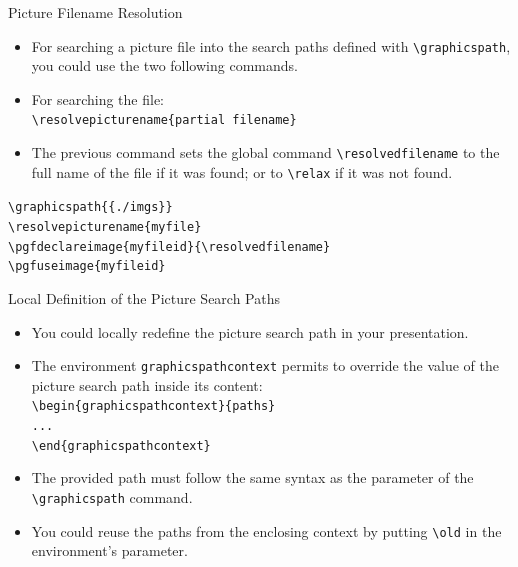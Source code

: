 \documentclass[english,sectioncirclenumberstyle]{ciadbeamer}
\begin{document}
\begin{frame}{Picture Filename Resolution}
	\begin{itemize}
	\item For searching a picture file into the search paths defined with \texttt{{\textbackslash}graphicspath}, you could use the two following commands.
	\item For searching the file: \\
		\texttt{{\textbackslash}resolvepicturename\{partial filename\}}
	\item The previous command sets the global command \texttt{{\textbackslash}resolvedfilename} to the full name of the file if it was found; or to \texttt{{\textbackslash}relax} if it was not found.
	\end{itemize}
	\begin{example}
		\texttt{{\textbackslash}graphicspath\{\{./imgs\}\}} \\
		\texttt{{\textbackslash}resolvepicturename\{myfile\}} \\
		\texttt{{\textbackslash}pgfdeclareimage\{myfileid\}\{{\textbackslash}resolvedfilename\}} \\
		\texttt{{\textbackslash}pgfuseimage\{myfileid\}} \\
	\end{example}
\end{frame}

\begin{frame}{Local Definition of the Picture Search Paths}
	\begin{itemize}
	\item You could locally redefine the picture search path in your presentation.
	\item The environment \texttt{graphicspathcontext} permits to override the value of the picture search path inside its content: \\
			\texttt{{\textbackslash}begin\{graphicspathcontext\}\{paths\}} \\
			\texttt{...} \\
			\texttt{{\textbackslash}end\{graphicspathcontext\}}
	\item The provided path must follow the same syntax as the parameter of the \texttt{{\textbackslash}graphicspath} command.
	\item You could reuse the paths from the enclosing context by putting \texttt{{\textbackslash}old} in the environment's parameter. \\
	\end{itemize}
\end{frame}
\end{document}
